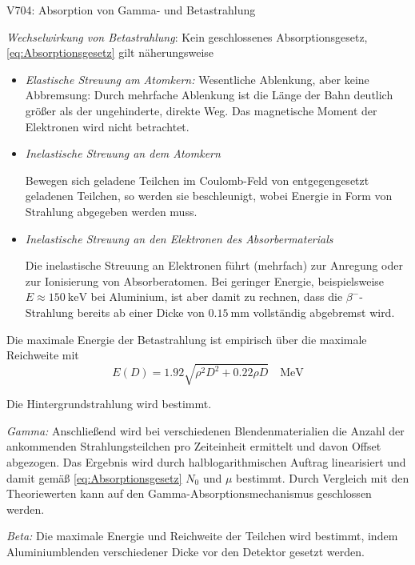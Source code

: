 \begin{Versuch}{V704: Absorption von Gamma- und Betastrahlung}
\begin{Theorie}
		\emph{Wechselwirkung von Betastrahlung}:
		Kein geschlossenes Absorptionsgesetz,\eqref{eq:Absorptionsgesetz} gilt näherungsweise

		\begin{itemize}
			\item{\emph{Elastische Streuung am Atomkern:}}
				Wesentliche Ablenkung, aber keine Abbremsung:
				Durch mehrfache Ablenkung ist die Länge der Bahn deutlich größer als der ungehinderte, direkte Weg.
				Das magnetische Moment der Elektronen wird nicht betrachtet.

			\item{\emph{Inelastische Streuung an dem Atomkern}}

				Bewegen sich geladene Teilchen im Coulomb-Feld von entgegengesetzt geladenen Teilchen, so werden sie beschleunigt, 
				wobei Energie in Form von Strahlung abgegeben werden muss.

			\item{\emph{Inelastische Streuung an den Elektronen des Absorbermaterials}}

				Die inelastische Streuung an Elektronen führt (mehrfach) zur Anregung oder zur Ionisierung von Absorberatomen.
				Bei geringer Energie, beispielsweise $E\approx\SI{150}{\kilo\electronvolt}$ bei Aluminium, ist aber damit zu rechnen, 
				dass die $\beta^-$-Strahlung bereits ab einer Dicke von $\SI{0.15}{\milli\meter}$ vollständig abgebremst wird.
		\end{itemize}
		Die maximale Energie der Betastrahlung ist empirisch über die maximale Reichweite mit
		\begin{equation}
			E(D)=1.92\sqrt{\rho^2D^2+0.22\rho D} \quad\si{\mega\electronvolt}
		\end{equation}
        \end{Theorie}
        
        \begin{Durchführung}
            Die Hintergrundstrahlung wird bestimmt.

            \emph{Gamma:} Anschließend wird bei verschiedenen Blendenmaterialien die Anzahl der ankommenden Strahlungsteilchen pro Zeiteinheit ermittelt und davon Offset abgezogen.
            Das Ergebnis wird durch halblogarithmischen Auftrag linearisiert und damit gemäß \eqref{eq:Absorptionsgesetz} $N_0$ und $\mu$ bestimmt.
            Durch Vergleich mit den Theoriewerten kann auf den Gamma-Absorptionsmechanismus geschlossen werden.

            \emph{Beta:} Die maximale Energie und Reichweite der Teilchen wird bestimmt, indem Aluminiumblenden verschiedener Dicke vor den Detektor gesetzt werden.


\end{Durchführung}
\end{Versuch}
